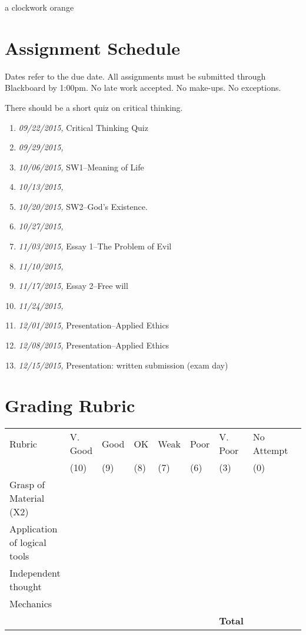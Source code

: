 \documentclass[11pt,article,oneside]{memoir}
\begin{document}
a clockwork orange


\section{Assignment Schedule}
Dates refer to the due date. All assignments must be submitted through Blackboard by 1:00pm. No late work accepted. No make-ups. No exceptions. 

There should be a short quiz on critical thinking. 
\begin{enumerate}
\item \textit{09/22/2015,} Critical Thinking Quiz
\item \textit{09/29/2015,} 
\item \textit{10/06/2015,} SW1--Meaning of Life 
\item \textit{10/13/2015,} 
\item \textit{10/20/2015,} SW2--God's Existence.
\item \textit{10/27/2015,} 
\item \textit{11/03/2015,} Essay 1--The Problem of Evil
\item \textit{11/10/2015,} 
\item \textit{11/17/2015,} Essay 2--Free will
\item \textit{11/24/2015,} 
\item \textit{12/01/2015,} Presentation--Applied Ethics
\item \textit{12/08/2015,} Presentation--Applied Ethics
\item \textit{12/15/2015,} Presentation: written submission (exam day)
\end{enumerate}

\newpage
\section{Grading Rubric}

\begin{center}


\resizebox{14cm}{!} {
    \begin{tabular}{ | l | l | l | l | l | l | l | l | l |    }
    \hline
    Rubric &  V. Good & Good & OK & Weak & Poor & V. Poor & No Attempt \\  
	 & (10) & (9) & (8) & (7) & (6) & (3)  & (0) \\    \hline
    Grasp of Material (X2) & & & & & & &\\ \hline   
    Application of logical tools &  & & & & & &\\ \hline
	Independent thought &  & & & & & &\\ \hline
 Mechanics & & & & & &  &\\ \hline \hline
 & &  & & &  & \textbf{Total}  & \\ \hline
    \end{tabular}
}


\end{center}




\end{document}
